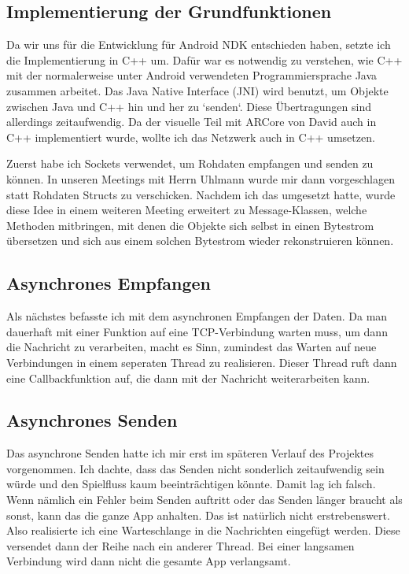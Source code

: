 \subsection{Implementierung der Grundfunktionen}
Da wir uns für die Entwicklung für Android NDK entschieden haben, setzte ich die Implementierung in C++ um.
Dafür war es notwendig zu verstehen, wie C++ mit der normalerweise unter Android verwendeten Programmiersprache Java
zusammen arbeitet.
Das Java Native Interface (JNI) wird benutzt, um Objekte zwischen Java und C++ hin und her zu `senden`. Diese Übertragungen sind allerdings
zeitaufwendig. Da der visuelle Teil mit ARCore von David auch in C++ implementiert wurde, wollte ich das Netzwerk auch in C++ umsetzen.
\par
Zuerst habe ich Sockets verwendet, um Rohdaten empfangen und senden zu können.
In unseren Meetings mit Herrn Uhlmann wurde mir dann vorgeschlagen statt Rohdaten Structs zu verschicken.
Nachdem ich das umgesetzt hatte, wurde diese Idee in einem weiteren Meeting erweitert zu Message-Klassen, welche Methoden mitbringen,
mit denen die Objekte sich selbst in einen Bytestrom übersetzen und sich aus einem solchen Bytestrom wieder rekonstruieren können.
\subsection{Asynchrones Empfangen}
Als nächstes befasste ich mit dem asynchronen Empfangen der Daten. Da man dauerhaft mit einer Funktion auf eine TCP-Verbindung warten muss,
um dann die Nachricht zu verarbeiten, macht es Sinn, zumindest das Warten auf neue Verbindungen in einem seperaten Thread zu realisieren.
Dieser Thread ruft dann eine Callbackfunktion auf, die dann mit der Nachricht weiterarbeiten kann.
\subsection{Asynchrones Senden}
Das asynchrone Senden hatte ich mir erst im späteren Verlauf des Projektes vorgenommen. Ich dachte, dass das Senden nicht sonderlich
zeitaufwendig sein würde und den Spielfluss kaum beeinträchtigen könnte. Damit lag ich falsch. Wenn nämlich ein Fehler beim Senden
auftritt oder das Senden länger braucht als sonst, kann das die ganze App anhalten. Das ist natürlich nicht erstrebenswert.
Also realisierte ich eine Warteschlange in die Nachrichten eingefügt werden. Diese versendet dann der Reihe nach ein anderer Thread.
Bei einer langsamen Verbindung wird dann nicht die gesamte App verlangsamt.
